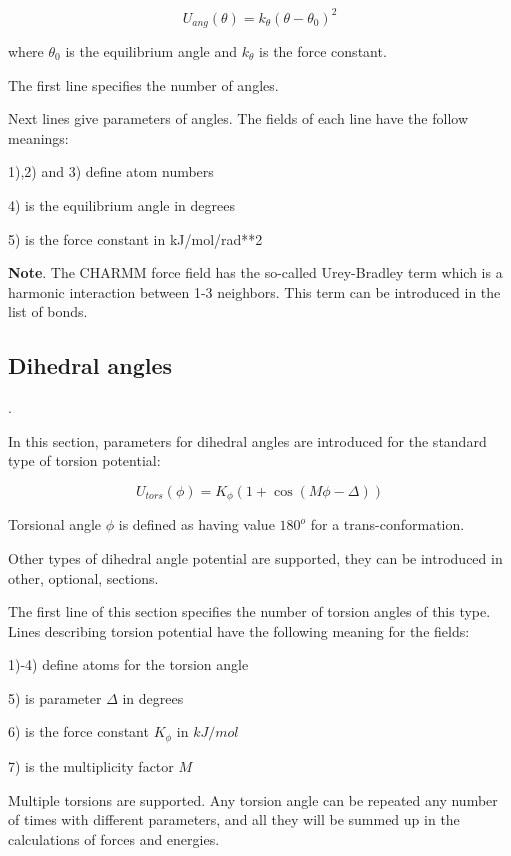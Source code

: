 \documentclass{article}
\begin{document}
\begin{equation}
\label{harm-ang}
U_{ang}(\theta) = k_{\theta}(\theta - \theta_0)^2
\end{equation}

\noindent
where $\theta_0$ is the equilibrium angle and $k_{\theta}$ is the force 
constant.

The first line specifies the number of angles.

Next lines give parameters of angles. The fields of each line have the 
follow meanings:

1),2) and 3) define atom numbers 

4) is the equilibrium angle in degrees

5) is the force constant in kJ/mol/rad**2

{\bf Note}. The CHARMM force field has the so-called Urey-Bradley term which is
a harmonic interaction between 1-3 neighbors. This term can be introduced 
in the list of bonds.

\subsection{Dihedral angles}. 

In this section, parameters for dihedral angles are introduced for the
standard type of torsion potential: 

\begin{equation}
\label{tors-0}
U_{tors}(\phi) = K_{\phi}(1+\cos(M\phi-\Delta))
\end{equation}

Torsional angle $\phi$ is defined as having value $180^o$ for a
trans-conformation.

Other types of dihedral angle potential are supported, they can be introduced
in other, optional, sections.

The first line of this section specifies the number of torsion angles of
this type. Lines describing torsion potential have the 
following meaning for the fields:

1)-4) define atoms for the torsion angle

5) is parameter $\Delta$ in degrees

6) is the force constant $K_{\phi}$ in $kJ/mol$

7) is the multiplicity factor $M$

Multiple torsions are supported. Any torsion angle 
can be repeated any number of times with different parameters, and all
they will be summed up in the calculations of forces and energies.
\end{document}
